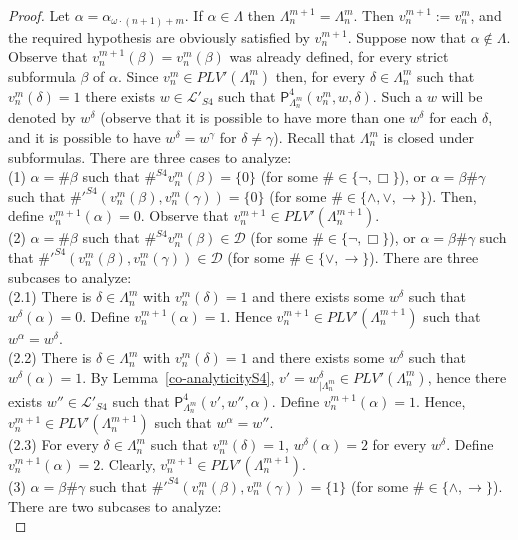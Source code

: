 \documentclass[12pt]{article}
\begin{document}
\begin{proof}
Let $\alpha=\alpha_{\omega\cdot (n+1) +m}$. If $\alpha \in \Lambda$ then ${\Lambda}_n^{m+1}={\Lambda}_n^m$. Then  $v_n^{m+1}:=v_n^m$, and the required hypothesis are obviously satisfied by $v_n^{m+1}$. Suppose now that  $\alpha \not\in \Lambda$. Observe that $v_n^{m+1}(\beta)=v_n^{m}(\beta)$ was already defined, for every strict subformula $\beta$ of $\alpha$. 
Since $v_n^m \in PLV'({\Lambda}_n^m)$ then, for every $\delta \in {\Lambda}_n^m$ such that $v_n^m(\delta)=1$ there exists $w   \in  \mathcal{L}'_{S4}$ such that $\mathsf{P}^4_{{\Lambda}_n^m}(v_n^m,w,\delta)$. Such a $w$ will be denoted by $w^\delta$ (observe that it is possible to have more than one $w^\delta$ for each $\delta$, and it is possible to have $w^\delta=w^\gamma$ for $\delta \neq\gamma$). Recall that ${\Lambda}_n^m$ is closed under subformulas.
There are three cases to analyze:\\[1mm]
(1) $\alpha=\#\beta$ such that $\#^{S4} v_n^{m}(\beta)=\{0\}$ (for some $\# \in \{\neg,\Box\}$), or $\alpha=\beta\#\gamma$ such that $\#'^{S4} (v_n^{m}(\beta),v_n^{m}(\gamma))=\{0\}$ (for some $\# \in \{\land,\vee,\to\}$). Then, define $v_n^{m+1}(\alpha)=0$. Observe that $v_n^{m+1} \in PLV'({\Lambda}_n^{m+1})$.\\[1mm]
(2) $\alpha=\#\beta$ such that $\#^{S4} v_n^{m}(\beta) \in \mathcal{D}$ (for some $\# \in \{\neg,\Box\}$), or $\alpha=\beta\#\gamma$ such that $\#'^{S4} (v_n^{m}(\beta),v_n^{m}(\gamma)) \in \mathcal{D}$ (for some $\# \in \{\vee,\to\}$). There are three subcases to analyze:\\[1mm]
(2.1) There is $\delta \in{\Lambda}_n^m$ with $v_n^{m}(\delta)=1$ and there exists some $w^\delta$ such that $w^\delta(\alpha)=0$. Define $v_n^{m+1}(\alpha)=1$. Hence $v_n^{m+1} \in PLV'(\Lambda_n^{m+1})$ such that $w^\alpha=w^\delta$.\\[1mm]
(2.2) There is $\delta \in \Lambda_n^m$ with $v_n^m(\delta)=1$ and there exists some $w^\delta$ such that $w^\delta(\alpha)=1$. By Lemma~\ref{co-analyticityS4}, $v'=w^\delta_{|\Lambda_n^m} \in PLV'(\Lambda_n^m)$, hence there exists $w'' \in  \mathcal{L}'_{S4}$ such that $\mathsf{P}^4_{\Lambda_n^m}(v',w'',\alpha)$.  Define $v_n^{m+1}(\alpha)=1$. Hence, $v_n^{m+1} \in PLV'(\Lambda_n^{m+1})$ such that $w^\alpha=w''$.\\[1mm]
(2.3) For every $\delta \in \Lambda_n^m$ such that $v_n^m(\delta)=1$, $w^\delta(\alpha)=2$ for every $w^\delta$. Define $v_n^{m+1}(\alpha)=2$. Clearly,  $v_n^{m+1} \in PLV'(\Lambda_n^{m+1})$.\\[1mm]
(3) $\alpha=\beta\#\gamma$ such that $\#'^{S4} (v_n^{m}(\beta),v_n^{m}(\gamma)) =\{1\}$ (for some $\# \in \{\land,\to\}$). There are two subcases to analyze:\\[1mm]

\end{proof}
\end{document}
